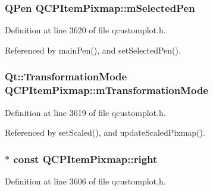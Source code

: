 \hypertarget{class_q_c_p_item_pixmap_a0949e5bb6a261fc4e9668e28e2effcfa}{}
\subsubsection[{m\+Selected\+Pen}]{\setlength{\rightskip}{0pt plus 5cm}Q\+Pen Q\+C\+P\+Item\+Pixmap\+::m\+Selected\+Pen\hspace{0.3cm}{\ttfamily [protected]}}\label{class_q_c_p_item_pixmap_a0949e5bb6a261fc4e9668e28e2effcfa}


Definition at line 3620 of file qcustomplot.\+h.



Referenced by main\+Pen(), and set\+Selected\+Pen().

\hypertarget{class_q_c_p_item_pixmap_ac9ecad3b9842363754e32eda2cf821bd}{}
\subsubsection[{m\+Transformation\+Mode}]{\setlength{\rightskip}{0pt plus 5cm}Qt\+::\+Transformation\+Mode Q\+C\+P\+Item\+Pixmap\+::m\+Transformation\+Mode\hspace{0.3cm}{\ttfamily [protected]}}\label{class_q_c_p_item_pixmap_ac9ecad3b9842363754e32eda2cf821bd}


Definition at line 3619 of file qcustomplot.\+h.



Referenced by set\+Scaled(), and update\+Scaled\+Pixmap().

\hypertarget{class_q_c_p_item_pixmap_ac9c0fd231f9e285765978a05d13f8280}{}
\subsubsection[{right}]{$\ast$ const Q\+C\+P\+Item\+Pixmap\+::right}\label{class_q_c_p_item_pixmap_ac9c0fd231f9e285765978a05d13f8280}


Definition at line 3606 of file qcustomplot.\+h.

